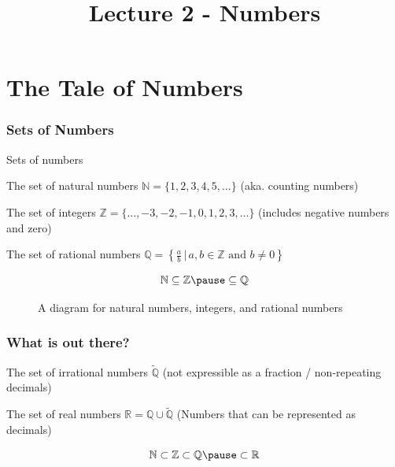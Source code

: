 \title{Lecture 2 - Numbers}
\frame{\titlepage}

\section{The Tale of Numbers}
\frame{\sectionpage}

\begin{frame}
\frametitle{Sets of Numbers}
Sets of numbers \pause 
\begin{block}{The set of natural numbers}
$\mathbb{N} = \{1,2,3,4,5,\ldots\} $  (aka. counting numbers)
\end{block}
\begin{block}{The set of integers}
$\mathbb{Z} = \{\ldots, -3,-2,-1,0,1,2,3,\ldots \}$ (includes negative numbers and zero)
\end{block}
\begin{block}{The set of rational numbers}
$\mathbb{Q} = \left\{ \frac{a}{b} \, | \, a,b \in \mathbb{Z} \text{ and } b \neq 0 \right\}$
\end{block}
\[ \mathbb{N} \subseteq \mathbb{Z} \pause \subseteq \mathbb{Q}\]
\end{frame}

\begin{frame}
\begin{figure}[h!]
\centering
{}
\caption{A diagram for natural numbers, integers, and rational numbers}
\end{figure}
\end{frame}

\begin{frame}
\frametitle{What is out there?}
\begin{block}{The set of irrational numbers}
 $\tilde{\mathbb{Q}}$  (not expressible as a fraction / non-repeating decimals) \pause
\end{block}
\begin{block}{The set of real numbers}
$\mathbb{R} = \mathbb{Q} \cup \tilde{\mathbb{Q}}$ 
(Numbers that can be represented as decimals) \pause
\end{block}
\[ \mathbb{N} \subset \mathbb{Z} \subset \mathbb{Q} \pause \subset \mathbb{R}\]
\end{frame}

